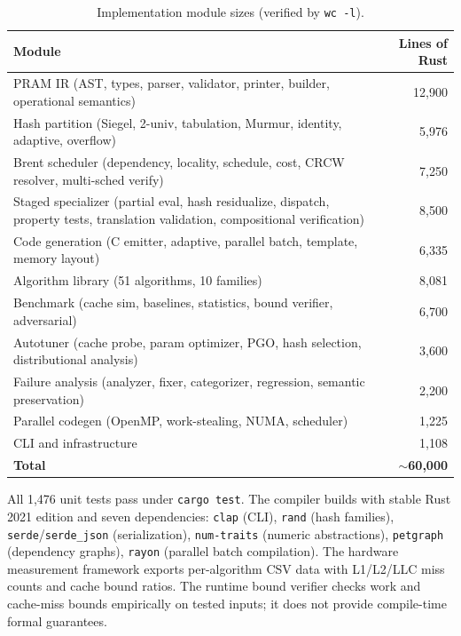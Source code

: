 \documentclass[11pt]{article}
\begin{document}
\begin{table}[h]
\centering
\caption{Implementation module sizes (verified by \texttt{wc -l}).}
\label{tab:implementation}
\begin{tabular}{@{}lr@{}}
\toprule
\textbf{Module} & \textbf{Lines of Rust} \\
\midrule
PRAM IR (AST, types, parser, validator, printer, builder, operational semantics) & 12,900 \\
Hash partition (Siegel, 2-univ, tabulation, Murmur, identity, adaptive, overflow) & 5,976 \\
Brent scheduler (dependency, locality, schedule, cost, CRCW resolver, multi-sched verify) & 7,250 \\
Staged specializer (partial eval, hash residualize, dispatch, property tests, translation validation, compositional verification) & 8,500 \\
Code generation (C emitter, adaptive, parallel batch, template, memory layout) & 6,335 \\
Algorithm library (51 algorithms, 10 families) & 8,081 \\
Benchmark (cache sim, baselines, statistics, bound verifier, adversarial) & 6,700 \\
Autotuner (cache probe, param optimizer, PGO, hash selection, distributional analysis) & 3,600 \\
Failure analysis (analyzer, fixer, categorizer, regression, semantic preservation) & 2,200 \\
Parallel codegen (OpenMP, work-stealing, NUMA, scheduler) & 1,225 \\
CLI and infrastructure & 1,108 \\
\midrule
\textbf{Total} & \textbf{$\sim$60,000} \\
\bottomrule
\end{tabular}
\end{table}

All 1,476 unit tests pass under \texttt{cargo test}.  The compiler
builds with stable Rust 2021 edition and seven dependencies: \texttt{clap}
(CLI), \texttt{rand} (hash families), \texttt{serde}/\texttt{serde\_json}
(serialization), \texttt{num-traits} (numeric abstractions),
\texttt{petgraph} (dependency graphs), \texttt{rayon} (parallel batch
compilation).  The hardware measurement
framework exports per-algorithm CSV data with L1/L2/LLC miss counts
and cache bound ratios.  The runtime bound verifier checks
work and cache-miss bounds empirically on tested inputs; it does not
provide compile-time formal guarantees.
\end{document}
